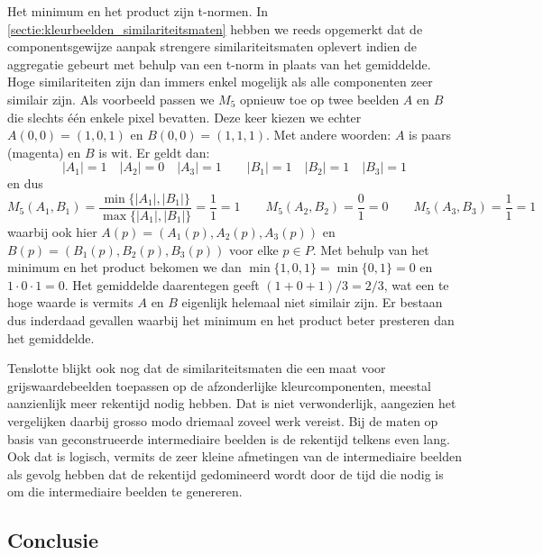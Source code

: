 Het minimum en het product zijn t-normen.
In \ref{sectie:kleurbeelden_similariteitsmaten} hebben we reeds opgemerkt dat de 
componentsgewijze aanpak strengere similariteitsmaten oplevert indien de
aggregatie gebeurt met behulp van een t-norm in plaats van het gemiddelde. 
Hoge similariteiten zijn dan immers enkel mogelijk als alle componenten
zeer similair zijn. Als voorbeeld passen we
$M_5$ opnieuw toe op twee beelden $A$ en $B$ die slechts \'e\'en enkele pixel bevatten. Deze
keer kiezen we echter $A(0,0)=(1,0,1)$ en $B(0,0)=(1,1,1)$. Met andere woorden: $A$ is paars 
(magenta) en $B$ is wit. Er geldt dan:
\begin{displaymath}
|A_1|=1 \quad |A_2|=0 \quad |A_3|=1 \qquad |B_1|=1 \quad |B_2|=1 \quad |B_3|=1
\end{displaymath}
en dus
\begin{displaymath}
M_5(A_1,B_1)=\frac{\min\{|A_1|,|B_1|\}}{\max\{|A_1|,|B_1|\}}=\frac{1}{1}=1 \qquad 
M_5(A_2,B_2)=\frac{0}{1}=0 \qquad M_5(A_3,B_3)=\frac{1}{1}=1
\end{displaymath}
waarbij ook hier $A(p)=(A_1(p),A_2(p),A_3(p))$ en $B(p)=(B_1(p),B_2(p),B_3(p))$ voor elke $p \in P$.
Met behulp van het minimum en het product bekomen we dan $\min\{1,0,1\}=\min\{0,1\}=0$
en $1 \cdot 0 \cdot 1 = 0$. Het gemiddelde daarentegen geeft $(1+0+1)/3=2/3$, wat
een te hoge waarde is vermits $A$ en $B$ eigenlijk helemaal niet similair zijn.
Er bestaan dus inderdaad gevallen waarbij het minimum en het product beter presteren dan 
het gemiddelde.

Tenslotte blijkt ook nog dat de similariteitsmaten die een maat voor grijswaardebeelden 
toepassen op de afzonderlijke kleurcomponenten, meestal aanzienlijk meer rekentijd nodig hebben. 
Dat is niet verwonderlijk, aangezien het vergelijken daarbij grosso modo driemaal zoveel werk vereist.
Bij de maten op basis van geconstrueerde intermediaire beelden is de rekentijd telkens even
lang. Ook dat is logisch, vermits de zeer kleine afmetingen van de intermediaire beelden als
gevolg hebben dat de rekentijd gedomineerd wordt door de tijd die nodig is om die 
intermediaire beelden te genereren.

\subsection{Conclusie}


